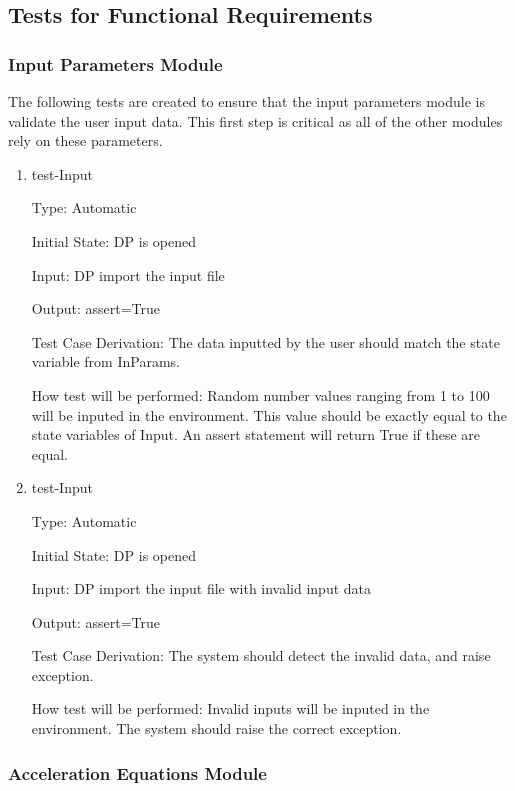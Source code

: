 \documentclass[12pt, titlepage]{article}
\begin{document}
\subsection{Tests for Functional Requirements}

\subsubsection{Input Parameters Module} \label{test_input}
The following tests are created to ensure that the input parameters module is validate the user input data. This first step is critical as all of the other modules rely on these parameters.   
 
\begin{enumerate}

\item{test-Input\\}

Type: Automatic
					
Initial State: DP is opened
					
Input: DP import the input file
					
Output: assert=True

Test Case Derivation: The data inputted by the user should match the state variable from InParams.

How test will be performed: Random number values ranging from 1 to 100 will be inputed in the environment. This value should be exactly equal to the state variables of Input. An assert statement will return True if these are equal. 


\item{test-Input\\}

Type: Automatic
          
Initial State: DP is opened
          
Input: DP import the input file with invalid input data
          
Output: assert=True

Test Case Derivation: The system should detect the invalid data, and raise exception.  

How test will be performed: Invalid inputs will be inputed in the environment. The system should raise the correct exception. 

    
\end{enumerate}

\subsubsection{Acceleration Equations Module} \label{test_acceleration}
 
\end{document}
